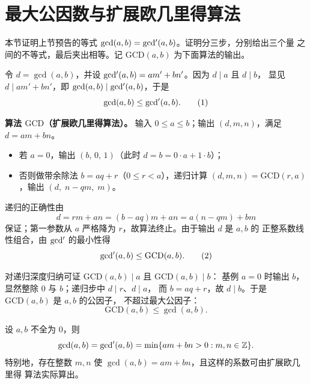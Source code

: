 \section{最大公因数与扩展欧几里得算法}\label{sec:gcd}

本节证明上节预告的等式 $\gcd(a,b)=\mathop{\mathrm{gcd'}}\nolimits(a,b)$。证明分三步，分别给出三个量
之间的不等式，最后夹出相等。记 $\mathrm{GCD}(a,b)$ 为下面算法的输出。

令 $d=\gcd(a,b)$，并设 $\mathop{\mathrm{gcd'}}\nolimits(a,b)=am'+bn'$。因为 $d\mid a$ 且 $d\mid b$，
显见 $d\mid am'+bn'$，即 $\gcd(a,b)\mid\mathop{\mathrm{gcd'}}\nolimits(a,b)$，于是
\begin{equation}
  \gcd(a,b)\le\mathop{\mathrm{gcd'}}\nolimits(a,b). \tag{1}
\end{equation}

\textbf{算法 $\mathrm{GCD}$（扩展欧几里得算法）。}
输入 $0\le a\le b$；输出 $(d,m,n)$，满足 $d=am+bn$。
\begin{itemize}[leftmargin=1.6em,itemsep=1pt]
  \item 若 $a=0$，输出 $(b,\,0,\,1)$（此时 $d=b=0\cdot a+1\cdot b$）；
  \item 否则做带余除法 $b=aq+r$（$0\le r<a$），递归计算
        $(d,m,n)=\mathrm{GCD}(r,a)$，输出 $(d,\;n-qm,\;m)$。
\end{itemize}
递归的正确性由
\[
  d=rm+an=(b-aq)m+an=a(n-qm)+bm
\]
保证；第一参数从 $a$ 严格降为 $r$，故算法终止。由于输出 $d$ 是 $a,b$ 的
正整系数线性组合，由 $\mathop{\mathrm{gcd'}}\nolimits$ 的最小性得
\begin{equation}
  \mathop{\mathrm{gcd'}}\nolimits(a,b)\le\mathrm{GCD}(a,b). \tag{2}
\end{equation}

对递归深度归纳可证 $\mathrm{GCD}(a,b)\mid a$ 且 $\mathrm{GCD}(a,b)\mid b$：
基例 $a=0$ 时输出 $b$，显然整除 $0$ 与 $b$；递归步中 $d\mid r$、$d\mid a$，
而 $b=aq+r$，故 $d\mid b$。于是 $\mathrm{GCD}(a,b)$ 是 $a,b$ 的公因子，
不超过最大公因子：
\begin{equation}
  \mathrm{GCD}(a,b)\le\gcd(a,b). \tag{3}
\end{equation}

\begin{theorem}\label{thm:bezout}
设 $a,b$ 不全为 $0$，则
\[
  \gcd(a,b)=\mathop{\mathrm{gcd'}}\nolimits(a,b)=\min\{am+bn>0:m,n\in\mathbb{Z}\}.
\]
特别地，存在整数 $m,n$ 使 $\gcd(a,b)=am+bn$，且这样的系数可由扩展欧几里得
算法实际算出。
\end{theorem}


